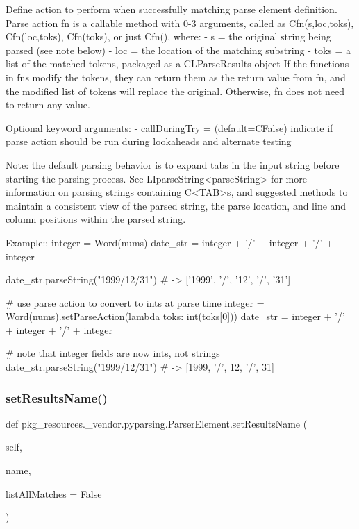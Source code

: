 \begin{DoxyVerb}Define action to perform when successfully matching parse element definition.
Parse action fn is a callable method with 0-3 arguments, called as C{fn(s,loc,toks)},
C{fn(loc,toks)}, C{fn(toks)}, or just C{fn()}, where:
 - s   = the original string being parsed (see note below)
 - loc = the location of the matching substring
 - toks = a list of the matched tokens, packaged as a C{L{ParseResults}} object
If the functions in fns modify the tokens, they can return them as the return
value from fn, and the modified list of tokens will replace the original.
Otherwise, fn does not need to return any value.

Optional keyword arguments:
 - callDuringTry = (default=C{False}) indicate if parse action should be run during lookaheads and alternate testing

Note: the default parsing behavior is to expand tabs in the input string
before starting the parsing process.  See L{I{parseString}<parseString>} for more information
on parsing strings containing C{<TAB>}s, and suggested methods to maintain a
consistent view of the parsed string, the parse location, and line and column
positions within the parsed string.

Example::
    integer = Word(nums)
    date_str = integer + '/' + integer + '/' + integer

    date_str.parseString("1999/12/31")  # -> ['1999', '/', '12', '/', '31']

    # use parse action to convert to ints at parse time
    integer = Word(nums).setParseAction(lambda toks: int(toks[0]))
    date_str = integer + '/' + integer + '/' + integer

    # note that integer fields are now ints, not strings
    date_str.parseString("1999/12/31")  # -> [1999, '/', 12, '/', 31]
\end{DoxyVerb}
 \mbox{\label{classpkg__resources_1_1__vendor_1_1pyparsing_1_1_parser_element_a787aafab87357373be31819f83517344}} 
\subsubsection{\texorpdfstring{set\+Results\+Name()}{setResultsName()}}
{\footnotesize\ttfamily def pkg\+\_\+resources.\+\_\+vendor.\+pyparsing.\+Parser\+Element.\+set\+Results\+Name (\begin{DoxyParamCaption}\item[{}]{self,  }\item[{}]{name,  }\item[{}]{list\+All\+Matches = {\ttfamily False} }\end{DoxyParamCaption})}

